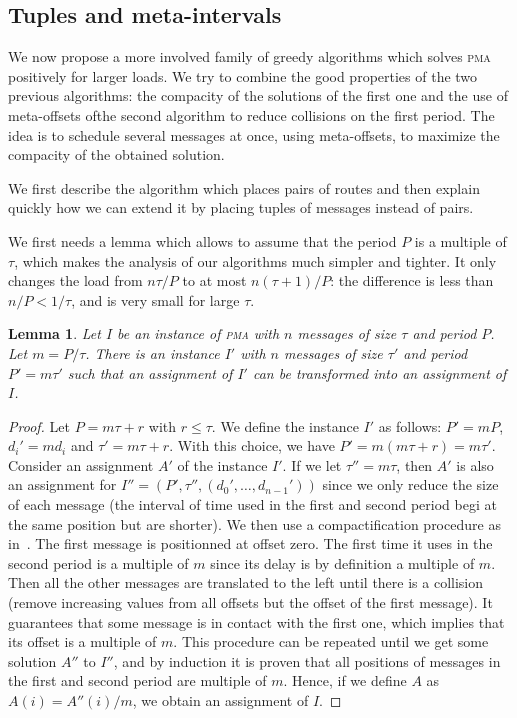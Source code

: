 \documentclass[10pt, conference, letterpaper]{IEEEtran}
\newtheorem{lemma}[theorem]{Lemma}
\newcommand\pma{\textsc{pma}\xspace}
\begin{document}
\subsection{Tuples and meta-intervals}

We now propose a more involved family of greedy algorithms which 
solves \pma positively for larger loads. We try to combine the good properties of the two previous algorithms: the compacity of the solutions of the first one and the use of meta-offsets ofthe second algorithm to reduce collisions on the first period.
The idea is to schedule several messages at once, using meta-offsets, to maximize the compacity of the obtained solution. 


We first describe the algorithm which places pairs of routes and then explain quickly how we can extend it by placing tuples of messages instead of pairs.

We first needs a lemma which allows to assume that the period $P$ is a multiple of $\tau$, 
which makes the analysis of our algorithms much simpler and tighter. It only changes the load
from $n \tau / P$ to at most $n (\tau +1)/ P$: the difference is less than $n /P < 1/\tau$,
and is very small for large $\tau$.

\begin{lemma}
Let $I$ be an instance of \pma with $n$ messages of size $\tau$ and period $P$.
Let $m = P / \tau$. There is an instance $I'$ with $n$ messages of size $\tau'$ and period $P'= m\tau'$ such that an assignment of $I'$ can be transformed into an assignment of $I$.
\end{lemma}
\begin{proof}
Let $P = m \tau + r$ with $r \leq \tau$. We define the instance $I'$ as follows: $P' = mP$, $d_{i}' = m d_i$ and $\tau' = m \tau + r$. With this choice, we have $P' = m(m \tau + r) = m \tau'$.
Consider an assignment $A'$ of the instance $I'$.
If we let $\tau'' = m\tau$, then $A'$ is also an assignment for $I'' = (P',\tau'',(d_{0}',\dots,d_{n-1}'))$ since we only reduce the size of each message (the interval of time used in the first and second period begi at the same position but are shorter).
We then use a compactification procedure as in~\cite{barth2018deterministic}. The first message is positionned at offset zero. The first time it uses in the second period is a multiple of $m$ since its delay is by definition a multiple of $m$. Then all the other messages are translated to the left until there is a collision (remove increasing values from all offsets but the offset of the first message). It guarantees that some message is in contact with the first one,  which implies that its offset is a multiple of $m$. This procedure can be repeated until we get some solution $A''$ to $I''$, and by induction it is proven that all positions of messages in the first and second period are multiple of $m$. Hence, if we define $A$ as $A(i) = A''(i)/m$, we obtain an assignment of $I$.
\end{proof}
\end{document}
